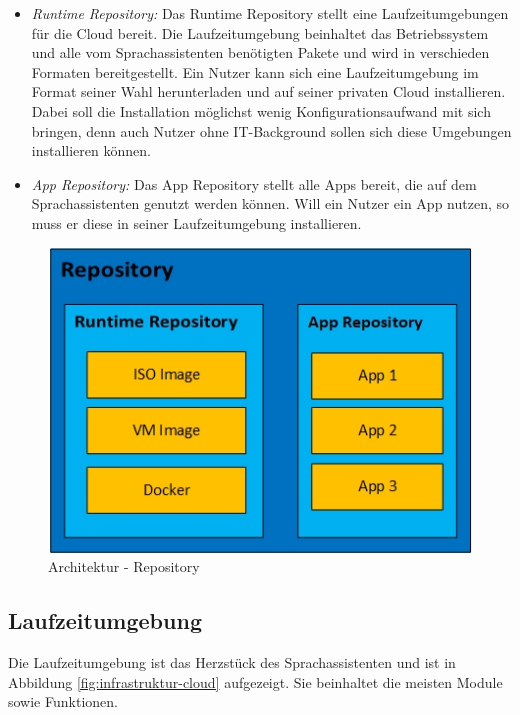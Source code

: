 \begin{itemize}
	\item \textsl{Runtime Repository:} Das Runtime Repository stellt eine Laufzeitumgebungen für die Cloud bereit. Die Laufzeitumgebung beinhaltet das Betriebssystem und alle vom Sprachassistenten benötigten Pakete und wird in verschieden Formaten bereitgestellt. Ein Nutzer kann sich eine Laufzeitumgebung im Format seiner Wahl herunterladen und auf seiner privaten Cloud installieren. Dabei soll die Installation möglichst wenig Konfigurationsaufwand mit sich bringen, denn auch Nutzer ohne IT-Background sollen sich diese Umgebungen installieren können. 
	\item \textsl{App Repository:} Das App Repository stellt alle Apps bereit, die auf dem Sprachassistenten genutzt werden können. Will ein Nutzer ein App nutzen, so muss er diese in seiner Laufzeitumgebung installieren.
\end{itemize}


\begin{figure}[h!]
	\centering
	\includegraphics[width=0.6\linewidth]{Picture/Infrastruktur-Repository.jpg}
	\caption[Architektur - Mobile App]{Architektur - Repository}
	\label{fig:infrastruktur-repository}
\end{figure}

\subsection{Laufzeitumgebung}
Die Laufzeitumgebung ist das Herzstück des Sprachassistenten und ist in Abbildung \ref{fig:infrastruktur-cloud} aufgezeigt. Sie beinhaltet die meisten Module sowie Funktionen.

